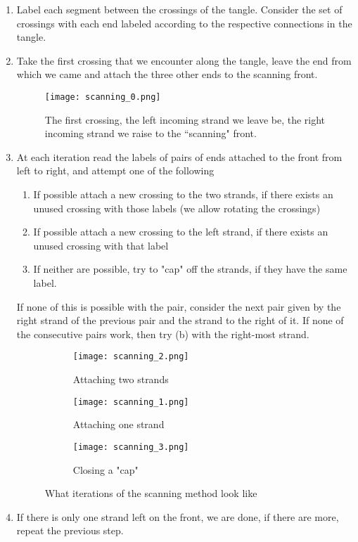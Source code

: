 \begin{enumerate}
\item Label each segment between the crossings of the tangle. Consider the set of crossings with each end labeled according to the respective connections in the tangle. 
\item Take the first crossing that we encounter along the tangle, leave the end from which we came and attach the three other ends to the scanning front.
\begin{figure}[!h]
\centering
\texttt{[image: scanning\_0.png]}
\caption{The first crossing, the left incoming strand we leave be, the right incoming strand we raise to the ``scanning" front.}
\end{figure}
\item At each iteration read the labels of pairs of ends attached to the front from left to right, and attempt one of the following
\begin{enumerate}
\item If possible attach a new crossing to the two strands, if there exists an unused crossing with those labels (we allow rotating the crossings)
\item If possible attach a new crossing to the left strand, if there exists an unused crossing with that label
\item If neither are possible, try to "cap" off the strands, if they have the same label.
\end{enumerate}
If none of this is possible with the pair, consider the next pair given by the right strand of the previous pair and the strand to the right of it. If none of the consecutive pairs work, then try (b) with the right-most strand.
\begin{figure}[h!]
\centering
\begin{subfigure}[t]{0.3\textwidth}
\centering
\texttt{[image: scanning\_2.png]}
\caption{Attaching two strands}
\label{fig:scan1}
\end{subfigure}
\hfill
\begin{subfigure}[t]{0.3\textwidth}
\centering
\texttt{[image: scanning\_1.png]}
\caption{Attaching one strand}
\label{fig:scan2}
\end{subfigure}
\hfill
\begin{subfigure}[t]{0.25\textwidth}
\centering
\texttt{[image: scanning\_3.png]}
\caption{Closing a "cap"}
\label{fig:scan3}
\end{subfigure}
\caption{What iterations of the scanning method look like}
\label{fig:scan}
\end{figure}
\item If there is only one strand left on the front, we are done, if there are more, repeat the previous step.
\end{enumerate}

